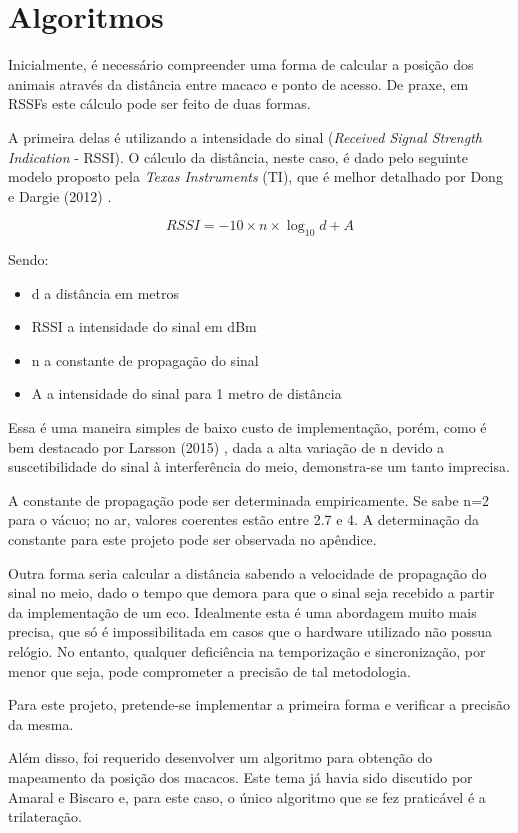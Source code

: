 \section{Algoritmos}
Inicialmente, é necessário compreender uma forma de calcular a posição dos animais através da distância entre macaco e ponto de acesso. De praxe, em RSSFs este cálculo pode ser feito de duas formas.

A primeira delas é utilizando a intensidade do sinal (\emph{Received Signal Strength Indication} - RSSI). O cálculo da distância, neste caso, é dado pelo seguinte modelo proposto pela \emph{Texas Instruments} (TI), que é melhor detalhado por Dong e Dargie (2012) \cite{dong}.

\begin{equation}
RSSI = -10 \times n \times \log_{10} d + A
\end{equation}

Sendo:
\begin{itemize}
\item d a distância em metros
\item RSSI a intensidade do sinal em dBm
\item n a constante de propagação do sinal
\item A a intensidade do sinal para 1 metro de distância
\end{itemize}

Essa é uma maneira simples de baixo custo de implementação, porém, como é bem destacado por Larsson (2015) \cite{larsson}, dada a alta variação de n devido a suscetibilidade do sinal à interferência do meio, demonstra-se um tanto imprecisa.

A constante de propagação pode ser determinada empiricamente. Se sabe n=2 para o vácuo; no ar, valores coerentes estão entre 2.7 e 4. A determinação da constante para este projeto pode ser observada no apêndice.

Outra forma seria calcular a distância sabendo a velocidade de propagação do sinal no meio, dado o tempo que demora para que o sinal seja recebido a partir da implementação de um eco. Idealmente esta é uma abordagem muito mais precisa, que só é impossibilitada em casos que o hardware utilizado não possua relógio. No entanto, qualquer deficiência na temporização e sincronização, por menor que seja, pode comprometer a precisão de tal metodologia.

Para este projeto, pretende-se implementar a primeira forma e verificar a precisão da mesma.

Além disso, foi requerido desenvolver um algoritmo para obtenção do mapeamento da posição dos macacos. Este tema já havia sido discutido por Amaral e Biscaro \cite{larissaamaralmiltonbiscaro} e, para este caso, o único algoritmo que se fez praticável é a trilateração.

